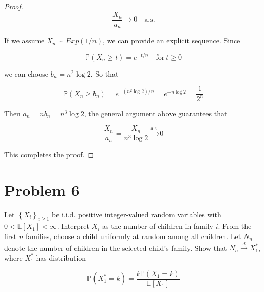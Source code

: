 \begin{proof}
\[\frac{\mathit{X}_{\mathit{n}}}{\mathit{a}_{\mathit{n}}}\rightarrow 0\quad\text{a.s.}\]

If we assume \(\mathit{X}_{\mathit{n}} \sim Exp(1/\mathit{n})\), we can provide an explicit sequence. Since

\[\mathbb{P}(\mathit{X}_{\mathit{n}} \geq \mathit{t}) = \mathit{e}^{- \mathit{t}/\mathit{n}}\quad\text{for}\ \mathit{t} \geq 0\]

we can choose \(\mathit{b}_{\mathit{n}} = \mathit{n}^{2}\log 2\). So that

\[\mathbb{P}(\mathit{X}_{\mathit{n}} \geq \mathit{b}_{\mathit{n}}) = \mathit{e}^{- (\mathit{n}^{2}\log 2)/\mathit{n}} = \mathit{e}^{- \mathit{n}\log 2} = \frac{1}{2^{\mathit{n}}}\]

Then \(\mathit{a}_{\mathit{n}} = \mathit{n}\mathit{b}_{\mathit{n}} = \mathit{n}^{3}\log 2\), the general argument above guarantees that

\[\frac{\mathit{X}_{\mathit{n}}}{\mathit{a}_{\mathit{n}}} = \frac{\mathit{X}_{\mathit{n}}}{\mathit{n}^{3}\log 2}\overset{\text{a.s.}}{\rightarrow}0\]

This completes the proof.

\end{proof}

\section{Problem 6}\label{hw05-problem-6}

Let \(\left\{ \mathit{X}_{\mathit{i}} \right\}_{\mathit{i} \geq 1}\) be i.i.d. positive integer-valued random variables with \(0 < \mathbb{E}\left\lbrack \mathit{X}_{1} \right\rbrack < \infty\). Interpret \(\mathit{X}_{\mathit{i}}\) as the number of children in family \(\mathit{i}\). From the first \(\mathit{n}\) families, choose a child uniformly at random among all children. Let \(\mathit{N}_{\mathit{n}}\) denote the number of children in the selected child's family. Show that \(\mathit{N}_{\mathit{n}}\overset{\mathit{d}}{\rightarrow}\mathit{X}_{1}^{\ast}\), where \(\mathit{X}_{1}^{\ast}\) has distribution

\[\mathbb{P}\left( {\mathit{X}_{1}^{\ast} = \mathit{k}} \right) = \frac{\mathit{k}\mathbb{P}\left( {\mathit{X}_{1} = \mathit{k}} \right)}{\mathbb{E}\left\lbrack \mathit{X}_{1} \right\rbrack}\]

